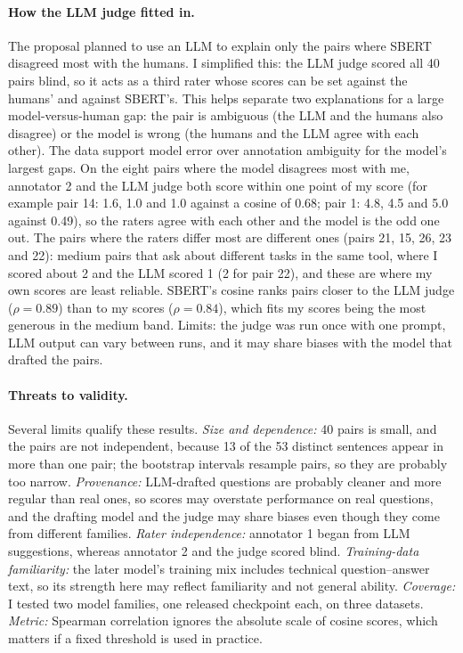 \documentclass[11pt]{article}
\begin{document}
\paragraph{How the LLM judge fitted in.}
The proposal planned to use an LLM to explain only the pairs where SBERT disagreed most with the humans. I simplified this: the LLM judge scored all 40 pairs blind, so it acts as a third rater whose scores can be set against the humans' and against SBERT's. This helps separate two explanations for a large model-versus-human gap: the pair is ambiguous (the LLM and the humans also disagree) or the model is wrong (the humans and the LLM agree with each other). The data support model error over annotation ambiguity for the model's largest gaps. On the eight pairs where the model disagrees most with me, annotator 2 and the LLM judge both score within one point of my score (for example pair 14: 1.6, 1.0 and 1.0 against a cosine of 0.68; pair 1: 4.8, 4.5 and 5.0 against 0.49), so the raters agree with each other and the model is the odd one out. The pairs where the raters differ most are different ones (pairs 21, 15, 26, 23 and 22): medium pairs that ask about different tasks in the same tool, where I scored about 2 and the LLM scored 1 (2 for pair 22), and these are where my own scores are least reliable. SBERT's cosine ranks pairs closer to the LLM judge ($\rho=0.89$) than to my scores ($\rho=0.84$), which fits my scores being the most generous in the medium band. Limits: the judge was run once with one prompt, LLM output can vary between runs, and it may share biases with the model that drafted the pairs.

\paragraph{Threats to validity.}
Several limits qualify these results. \emph{Size and dependence:} 40 pairs is small, and the pairs are not independent, because 13 of the 53 distinct sentences appear in more than one pair; the bootstrap intervals resample pairs, so they are probably too narrow. \emph{Provenance:} LLM-drafted questions are probably cleaner and more regular than real ones, so scores may overstate performance on real questions, and the drafting model and the judge may share biases even though they come from different families. \emph{Rater independence:} annotator 1 began from LLM suggestions, whereas annotator 2 and the judge scored blind. \emph{Training-data familiarity:} the later model's training mix includes technical question--answer text, so its strength here may reflect familiarity and not general ability. \emph{Coverage:} I tested two model families, one released checkpoint each, on three datasets. \emph{Metric:} Spearman correlation ignores the absolute scale of cosine scores, which matters if a fixed threshold is used in practice.
\end{document}
